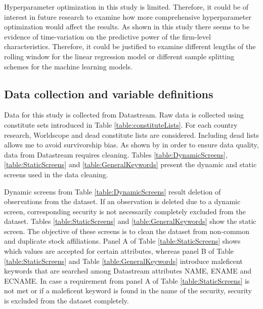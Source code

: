 \documentclass[12pt]{article}
\begin{document}
Hyperparameter optimization in this study is limited. Therefore, it could be of interest in future research to examine how more comprehensive hyperparameter optimization would affect the results. As shown in this study there seems to be evidence of time-variation on the predictive power of the firm-level characteristics. Therefore, it could be justified to examine different lengths of the rolling window for the linear regression model or different sample splitting schemes for the machine learning models.

\clearpage

\begin{appendices}
\section{Data collection and variable definitions}
\renewcommand{\thefigure}{A.\arabic{figure}}
\setcounter{figure}{0}
\renewcommand{\thetable}{A.\arabic{table}}
\setcounter{table}{0}

Data for this study is collected from Datastream. Raw data is collected using constitute sets introduced in Table \ref{table:constituteLists}. For each country research, Worldscope and dead constitute lists are considered. Including dead lists allows me to avoid survivorship bias. As shown by \citet{Ince2006} in order to ensure data quality, data from Datastream requires cleaning.\footnotemark {} Tables \ref{table:DynamicScreens}, \ref{table:StaticScreens} and \ref{table:GeneralKeywords} present the dynamic and static screens used in the data cleaning. \par

Dynamic screens from Table \ref{table:DynamicScreens} result deletion of observations from the dataset. If an observation is deleted due to a dynamic screen, corresponding security is not necessarily completely excluded from the dataset. Tables \ref{table:StaticScreens} and \ref{table:GeneralKeywords} show the static screen. The objective of these screens is to clean the dataset from non-common and duplicate stock affiliations. Panel A of Table \ref{table:StaticScreens} shows which values are accepted for certain attributes, whereas panel B of Table \ref{table:StaticScreens} and Table \ref{table:GeneralKeywords} introduce maleficent keywords that are searched among Datastream attributes NAME, ENAME and ECNAME. In case a requirement from panel A of Table \ref{table:StaticScreens} is not met or if a maleficent keyword is found in the name of the security, security is excluded from the dataset completely. \par


\end{appendices}
\end{document}
